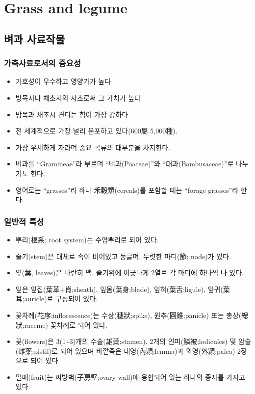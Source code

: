 \documentclass[]{book}
\providecommand{\tightlist}{%
  \setlength{\itemsep}{0pt}\setlength{\parskip}{0pt}}
\begin{document}
\chapter{Grass and legume}\label{legumeandgrass}

\section{벼과 사료작물}\label{-}

\subsection{가축사료로서의 중요성}\label{-}

\begin{itemize}
\tightlist
\item
  기호성이 우수하고 영양가가 높다
\item
  방목지나 채초지의 사초로써 그 가치가 높다
\item
  방목과 채초시 견디는 힘이 가장 강하다
\item
  전 세계적으로 가장 널리 분포하고 있다(600屬 5,000種).
\item
  가장 우세하게 자라며 중요 곡류의 대부분을 차지한다.
\item
  벼과를 ``Gramineae''라 부르며 ``벼과(Poaceae)''와
  ``대과(Bambusaceae)''로 나누기도 한다.
\item
  영어로는 ``grasses''라 하나 禾穀類(cereals)를 포함할 때는 ``forage
  grasses''라 한다.
\end{itemize}

\subsection{일반적 특성}\label{-}

\begin{itemize}
\tightlist
\item
  뿌리(根系; root system)는 수염뿌리로 되어 있다.
\item
  줄기(stem)은 대체로 속이 비어있고 둥글며, 두렷한 마디(節; node)가
  있다.
\item
  잎(葉, leaves)은 나란히 맥, 줄기위에 어긋나게 2열로 각 마디에 하나씩
  나 있다.
\item
  잎은 잎집(葉革+肖;sheath), 잎몸(葉身;blade), 잎혀(葉舌;ligule),
  잎귀(葉耳;auricle)로 구성되어 있다.
\item
  꽃차례(花序;inflorescence)는 수상(穗狀;spike), 원추(圓錐;panicle) 또는
  총상(總狀;raceme) 꽃차례로 되어 있다.
\item
  꽃(flowers)은 3(1\textasciitilde{}3)개의 수술(雄蘂;stamen), 2개의
  인피(鱗被;lodicules) 및 암술(雌蘂;pistil)로 되어 있으며 바깥족은
  내영(內穎;lemma)과 외영(外穎;palea) 2장으로 되어 있다.
\item
  열매(fruit)는 씨방벽(子房壁;ovary wall)에 융합되어 있는 하나의 종자를
  가지고 있다.
\end{itemize}
\end{document}
